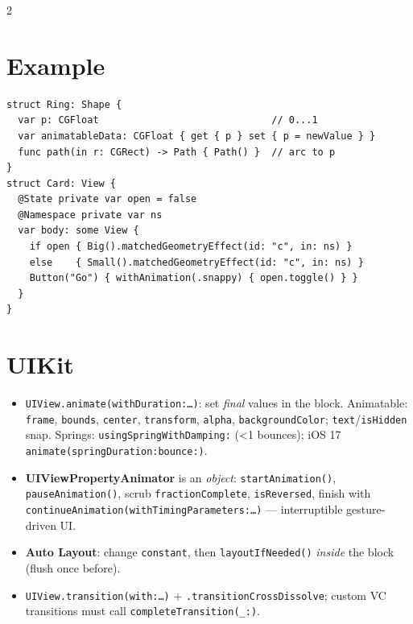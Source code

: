 \documentclass[8pt]{extarticle}
\begin{document}
\begin{multicols}{2}
\section{Example}
\begin{lstlisting}[language=SwiftSheet]
struct Ring: Shape {
  var p: CGFloat                              // 0...1
  var animatableData: CGFloat { get { p } set { p = newValue } }
  func path(in r: CGRect) -> Path { Path() }  // arc to p
}
struct Card: View {
  @State private var open = false
  @Namespace private var ns
  var body: some View {
    if open { Big().matchedGeometryEffect(id: "c", in: ns) }
    else    { Small().matchedGeometryEffect(id: "c", in: ns) }
    Button("Go") { withAnimation(.snappy) { open.toggle() } }
  }
}
\end{lstlisting}

\section{UIKit}
\begin{itemize}
  \item \texttt{UIView.animate(withDuration:…)}: set \emph{final} values in the
        block. Animatable: \texttt{frame}, \texttt{bounds}, \texttt{center},
        \texttt{transform}, \texttt{alpha}, \texttt{backgroundColor};
        \texttt{text}/\texttt{isHidden} snap. Springs:
        \texttt{usingSpringWithDamping:} (\textless 1 bounces); iOS 17
        \texttt{animate(springDuration:bounce:)}.
  \item \textbf{UIViewPropertyAnimator} is an \emph{object}:
        \texttt{startAnimation()}, \texttt{pauseAnimation()}, scrub
        \texttt{fractionComplete}, \texttt{isReversed},
        finish with \texttt{continueAnimation(withTimingParameters:…)} —
        interruptible gesture-driven UI.
  \item \textbf{Auto Layout}: change \texttt{constant}, then
        \texttt{layoutIfNeeded()} \emph{inside} the block (flush once before).
  \item \texttt{UIView.transition(with:…)} + \texttt{.transitionCrossDissolve};
        custom VC transitions must call \texttt{completeTransition(\_:)}.
\end{itemize}

\columnbreak


\end{multicols}
\end{document}
